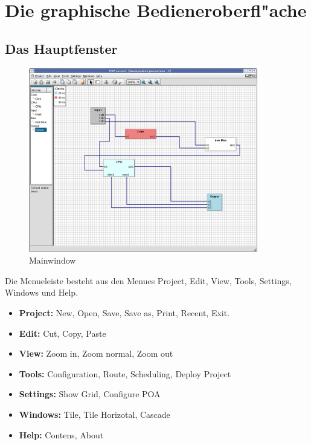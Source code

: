 \documentclass[a4paper,titlepage,12pt,ngerman]{scrbook}
\begin{document}
\chapter{Die graphische Bedieneroberfl"ache}

\section{Das Hauptfenster}
\begin{figure}[htbp]

\begin{center}

\includegraphics[width=10cm]{Mainwindow1}

\caption{Mainwindow}\label{test}

\end{center}

\end{figure}

Die Menueleiste besteht aus den Menues Project, Edit, View, Tools, Settings, Windows und Help.

\begin{itemize}
\item {\bf Project:}	New, Open, Save, Save as, Print, Recent, Exit.
\item {\bf Edit:}	Cut, Copy, Paste
\item {\bf View:}	Zoom in, Zoom normal, Zoom out 
\item {\bf Tools:} 	Configuration, Route, Scheduling, Deploy Project
\item {\bf Settings:}	Show Grid, Configure POA
\item {\bf Windows:} 	Tile, Tile Horizotal, Cascade
\item {\bf Help:} 	Contens, About
\end{itemize}
\end{document}
